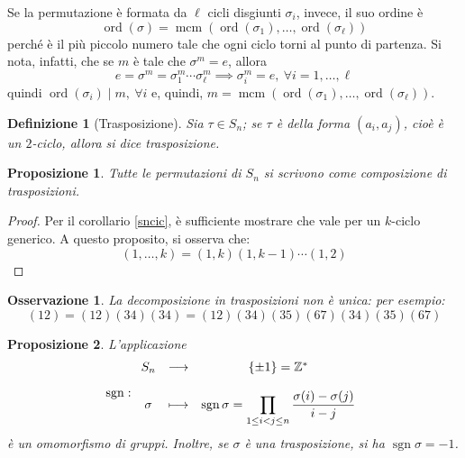 \documentclass[12pt]{scrartcl}
\theoremstyle{style}
\newtheorem{definizione}{Definizione}[section]
\newtheorem{prop}{Proposizione}[section]
\newtheorem{osservazione}{Osservazione}[section]
\numberwithin{equation}{subsection}
\begin{document}
Se la permutazione \`e formata da $\ell $ cicli disgiunti $\sigma _i$, invece, il suo ordine \`e 
\[
\operatorname{ord}(\sigma ) = \operatorname{mcm} (\operatorname{ord}(\sigma_1) , \ldots, \operatorname{ord}(\sigma _\ell ) )
\] 
perch\'e \`e il pi\`u piccolo numero tale che ogni ciclo torni al punto di partenza.
Si nota, infatti, che se $m$ \`e tale che $\sigma ^m = e$, allora
\[
	e = \sigma  ^m  = \sigma_1 ^m \cdots \sigma _\ell ^m \implies \sigma _i^m = e , \ \forall i=1,\ldots,\ell 
\] 
quindi $\operatorname{ord}(\sigma _i)  \mid m, \ \forall i$ e, quindi, $m=\operatorname{mcm} (\operatorname{ord}(\sigma _1) ,\ldots,\operatorname{ord}(\sigma _\ell ) )$.
\begin{definizione}
	[Trasposizione]
	Sia $\tau \in S_n$; se $\tau $ \`e della forma $(a_i,a_j)$, cio\`e \`e un $2$-ciclo, allora si dice \textit{trasposizione}.
\end{definizione}
\begin{prop}
	Tutte le permutazioni di $S_n$ si scrivono come composizione di trasposizioni. 
\end{prop}
	\begin{proof}
		Per il corollario \ref{sncic}, \`e sufficiente mostrare che vale per un $k$-ciclo generico. 
		A questo proposito, si osserva che:
		\[
			(1,\ldots,k)= (1,k) (1,k-1)\cdots (1,2)
		\] 
	\end{proof}
\begin{osservazione}
La decomposizione in trasposizioni non \`e unica: per esempio:
\[
	(12) = (12)(34)(34) = (12)(34)(35)(67)(34)(35)(67)
\] 
\end{osservazione}
\begin{prop}
	L'applicazione 
	\[
	\operatorname{sgn} :
	\begin{array}
		{c c c}
		S_n & \longrightarrow & \left\{ \pm 1 \right\} = \mathbb{Z}^*\\
		\\
		\sigma & \longmapsto & \operatorname{sgn} \sigma =\displaystyle  \prod_{1\le i< j\le n} \frac{\sigma (i) - \sigma (j)}{i-j}
	\end{array}
	\] 
	\`e un omomorfismo di gruppi. 
	Inoltre, se $\sigma $ \`e una trasposizione, si ha $\operatorname{sgn} \sigma = -1$.
\end{prop}
\end{document}
